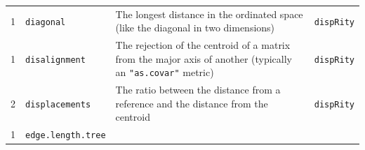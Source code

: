 \documentclass[
]{book}
\begin{document}
\begin{longtable}[]{@{}llll@{}}
\begin{minipage}[t]{0.07\columnwidth}\raggedright
1\strut
\end{minipage} & \begin{minipage}[t]{0.07\columnwidth}\raggedright
\texttt{diagonal}\strut
\end{minipage} & \begin{minipage}[t]{0.64\columnwidth}\raggedright
The longest distance in the ordinated space (like the diagonal in two dimensions)\strut
\end{minipage} & \begin{minipage}[t]{0.10\columnwidth}\raggedright
\texttt{dispRity}\strut
\end{minipage}\tabularnewline
\begin{minipage}[t]{0.07\columnwidth}\raggedright
1\strut
\end{minipage} & \begin{minipage}[t]{0.07\columnwidth}\raggedright
\texttt{disalignment}\strut
\end{minipage} & \begin{minipage}[t]{0.64\columnwidth}\raggedright
The rejection of the centroid of a matrix from the major axis of another (typically an \texttt{"as.covar"} metric)\strut
\end{minipage} & \begin{minipage}[t]{0.10\columnwidth}\raggedright
\texttt{dispRity}\strut
\end{minipage}\tabularnewline
\begin{minipage}[t]{0.07\columnwidth}\raggedright
2\strut
\end{minipage} & \begin{minipage}[t]{0.07\columnwidth}\raggedright
\texttt{displacements}\strut
\end{minipage} & \begin{minipage}[t]{0.64\columnwidth}\raggedright
The ratio between the distance from a reference and the distance from the centroid\strut
\end{minipage} & \begin{minipage}[t]{0.10\columnwidth}\raggedright
\texttt{dispRity}\strut
\end{minipage}\tabularnewline
\begin{minipage}[t]{0.07\columnwidth}\raggedright
1\strut
\end{minipage} & \begin{minipage}[t]{0.07\columnwidth}\raggedright
\texttt{edge.length.tree}\strut
\end{minipage} & \begin{minipage}[t]{0.64\columnwidth}\raggedright

\end{minipage}
\end{longtable}
\end{document}

